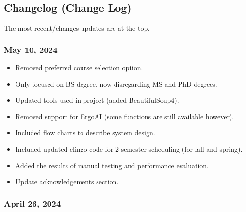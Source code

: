 \documentclass[12pt]{article}
\begin{document}
    \subsection{Changelog (Change Log)}
    \label{subsec:change}

    The most recent/changes updates are at the top.

    \subsubsection{May 10, 2024}

    \begin{itemize}
        \item Removed preferred course selection option.
        \item Only focused on BS degree, now disregarding MS and PhD degrees.
        \item Updated tools used in project (added BeautifulSoup4).
        \item Removed support for ErgoAI (some functions are still available however).
        \item Included flow charts to describe system design.
        \item Included updated clingo code for 2 semester scheduling (for fall and spring).
        \item Added the results of manual testing and performance evaluation.
        \item Update acknowledgements section.
    \end{itemize}

    
    \subsubsection{April 26, 2024}
\end{document}
